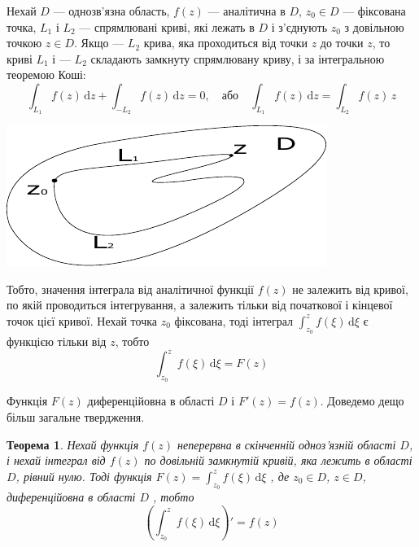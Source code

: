\documentclass[12pt,fleqn]{article}
\theoremstyle{theorem}
\newtheorem{thm}{Теорема}[section]
\theoremstyle{proof}
\numberwithin{figure}{section}
\numberwithin{equation}{section}
\begin{document}
Нехай $D$ --- однозв'язна область, $f(z)$ --- аналітична в $D$, $z_0 \in D$ --- фіксована точка, $L_1$ і $L_2$ --- спрямлювані криві, які лежать в $D$ і з'єднують $z_0$ з довільною точкою $z \in D$. Якщо --- $L_2$ крива, яка проходиться від точки $z$ до точки $z$, то криві $L_1$ і --- $L_2$ складають замкнуту спрямлювану криву, і за інтегральною теоремою Коші:
\[ \int_{L_1}f(z)\,\mathrm{d}z + \int_{-L_2}f(z)\,\mathrm{d}z=0, \quad \text{або} \quad \int_{L_1}f(z)\,\mathrm{d}z=\int_{L_2}f(z)\,z \]

\begin{center}
  \includegraphics{fig2}
\end{center}

Тобто, значення інтеграла від аналітичної функції $f(z)$ не залежить від кривої, по якій проводиться інтегрування, а залежить тільки від початкової і кінцевої точок цієї кривої. Нехай точка $z_0$ фіксована, тоді інтеграл $\int_{z_0}^{z} f(\xi) \,\mathrm{d}\xi$ є функцією тільки від $z$, тобто
\begin{equation}\label{8.5.1}
\int_{z_0}^{z} f(\xi) \,\mathrm{d}\xi = F(z)
\end{equation}

Функція $F(z)$ диференційовна в області $D$ і $F'(z)=f(z)$. Доведемо дещо більш загальне твердження.

\begin{thm}\label{theor_8.5.1}
Нехай функція $f(z)$ неперервна в скінченній одноз'язній області $D$, і нехай інтеграл від $f(z)$ по довільній замкнутій кривій, яка лежить в області $D$, рівний нулю. Тоді функція $F(z)= \int_{z_0}^{z} f(\xi) \,\mathrm{d}\xi$ , де $z_0 \in D$, $z \in D$, диференційовна в області $D$ , тобто
\[ \left(\int_{z_0}^{z} f(\xi) \,\mathrm{d}\xi\right)' = f(z) \]

\end{thm}
\end{document}

